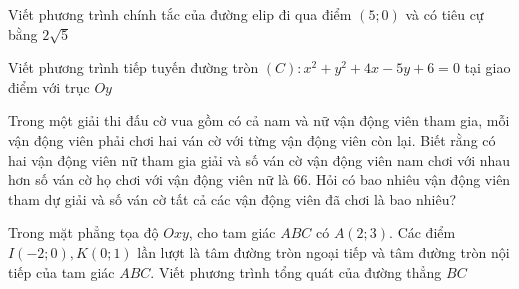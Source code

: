 \begin{ex}
Viết phương trình chính tắc của đường elip đi qua điểm $(5;0)$ và có tiêu cự bằng $2\sqrt{5}$
\end{ex}
\begin{ex}
Viết phương trình tiếp tuyến đường tròn $(C)\colon x^2+y^2+4x-5y+6=0$ tại giao điểm với trục $Oy$
\end{ex}
\begin{ex}
Trong một giải thi đấu cờ vua gồm có cả nam và nữ vận động viên tham gia, mỗi vận động viên phải chơi hai ván cờ với từng vận động viên còn lại. Biết rằng có hai vận động viên nữ tham gia giải và số ván cờ vận động viên nam chơi với nhau hơn số ván cờ họ chơi với vận động viên nữ là $66$. Hỏi có bao nhiêu vận động viên tham dự giải và số ván cờ tất cả các vận động viên đã chơi là bao nhiêu?
\end{ex}
\begin{ex}
Trong mặt phẳng tọa độ $Oxy$, cho tam giác $ABC$ có $A(2;3)$. Các điểm $I(-2;0),K(0;1)$ lần lượt là tâm đường tròn ngoại tiếp và tâm đường tròn nội tiếp của tam giác $ABC$. Viết phương trình tổng quát của đường thẳng $BC$
\end{ex}


